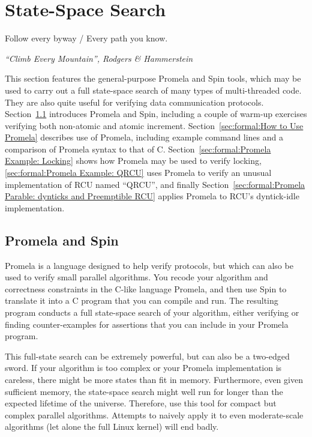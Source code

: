 
\section{State-Space Search}
\label{sec:formal:State-Space Search}
%
\epigraph{Follow every byway / Every path you know.}
	 {\emph{``Climb Every Mountain'', Rodgers \& Hammerstein}}

This section features the general-purpose Promela and Spin tools,
which may be used to carry out a full
state-space search of many types of multi-threaded code.
They are also quite useful for verifying data communication protocols.
Section~\ref{sec:formal:Promela and Spin}
introduces Promela and Spin, including a couple of warm-up exercises
verifying both non-atomic and atomic increment.
Section~\ref{sec:formal:How to Use Promela}
describes use of Promela, including example command lines and a
comparison of Promela syntax to that of C.
Section~\ref{sec:formal:Promela Example: Locking}
shows how Promela may be used to verify locking,
\ref{sec:formal:Promela Example: QRCU}
uses Promela to verify an unusual implementation of RCU named ``QRCU'',
and finally
Section~\ref{sec:formal:Promela Parable: dynticks and Preemptible RCU}
applies Promela to RCU's dyntick-idle implementation.

\subsection{Promela and Spin}
\label{sec:formal:Promela and Spin}

Promela is a language designed to help verify protocols, but which
can also be used to verify small parallel algorithms.
You recode your algorithm and correctness constraints in the C-like
language Promela, and then use Spin to translate it into a C program
that you can compile and run.
The resulting program conducts a full state-space search of your
algorithm, either verifying or finding counter-examples for
assertions that you can include in your Promela program.

This full-state search can be extremely powerful, but can also be a two-edged
sword.
If your algorithm is too complex or your Promela implementation is
careless, there might be more states than fit in memory.
Furthermore, even given sufficient memory, the state-space search might
well run for longer than the expected lifetime of the universe.
Therefore, use this tool for compact but complex parallel algorithms.
Attempts to naively apply it to even moderate-scale algorithms (let alone
the full Linux kernel) will end badly.

